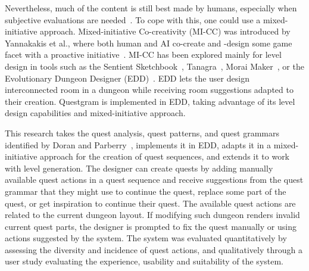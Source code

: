 Nevertheless, much of the content is still best made by humans, especially when subjective evaluations are needed~. To cope with this, one could use a mixed-initiative approach.
Mixed-initiative Co-creativity (MI-CC) was introduced by Yannakakis et al., where both human and AI co-create and -design some game facet with a proactive initiative~. MI-CC has been explored mainly for level design in tools such as the Sentient Sketchbook~, Tanagra~, Morai Maker~, or the Evolutionary Dungeon Designer (EDD)~. EDD lets the user design interconnected room in a dungeon while receiving room suggestions adapted to their creation. Questgram is implemented in EDD, taking advantage of its level design capabilities and mixed-initiative approach.


This research takes the quest analysis, quest patterns, and quest grammars identified by Doran and Parberry~, implements it in EDD, adapts it in a mixed-initiative approach for the creation of quest sequences, and extends it to work with level generation. The designer can create quests by adding manually available quest actions in a quest sequence and receive suggestions from the quest grammar that they might use to continue the quest, replace some part of the quest, or get inspiration to continue their quest. The available quest actions are related to the current dungeon layout. If modifying such dungeon renders invalid current quest parts, the designer is prompted to fix the quest manually or using actions suggested by the system. The system was evaluated quantitatively by assessing the diversity and incidence of quest actions, and qualitatively through a user study evaluating the experience, usability and suitability of the system.





